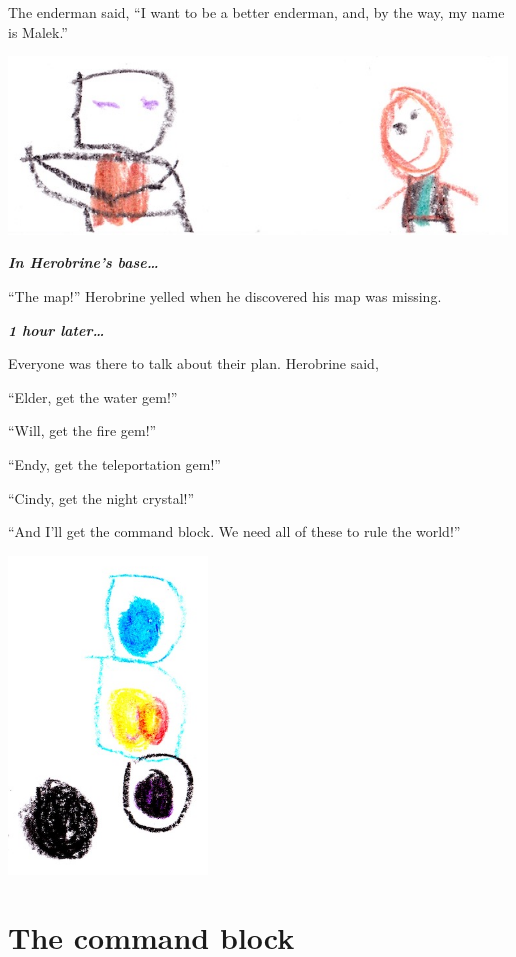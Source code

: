 \documentclass[12pt,oneside]{krantz}
\begin{document}
The enderman said, ``I want to be a better enderman, and, by the way, my
name is Malek.''

\includegraphics[width=5.20833in,height=\textheight]{img/malek-beckett.jpg}

\textbf{\emph{In Herobrine's base\ldots{}}}

``The map!'' Herobrine yelled when he discovered his map was missing.

\textbf{\emph{1 hour later\ldots{}}}

Everyone was there to talk about their plan. Herobrine said,

``Elder, get the water gem!''

``Will, get the fire gem!''

``Endy, get the teleportation gem!''

``Cindy, get the night crystal!''

``And I'll get the command block. We need all of these to rule the
world!''

\includegraphics[width=2.08333in,height=\textheight]{img/crystals.jpg}

\hypertarget{the-command-block}{%
\chapter{The command block}\label{the-command-block}}
\end{document}
